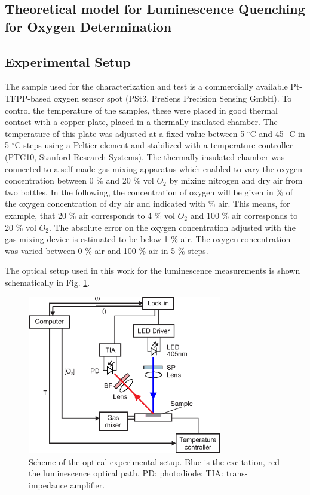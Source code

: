 \documentclass[9pt,twocolumn,twoside,pdftex]{optica}
\begin{document}
\subsection{Theoretical model for Luminescence Quenching for Oxygen Determination}
\label{Theory}

\subsection{Experimental Setup}
\label{Experimental}

The sample used for the characterization and test is a commercially available Pt-TFPP-based oxygen sensor spot (PSt3, PreSens Precision Sensing GmbH).
To control the temperature of the samples, these were placed in good thermal contact with a copper plate, placed in a thermally insulated chamber. The temperature of this plate was adjusted at a fixed value between 5 $^\circ$C and 45 $^\circ$C in 5 $^\circ$C steps using a Peltier element and stabilized with a temperature controller (PTC10, Stanford Research Systems). The thermally insulated chamber was connected to a self-made gas-mixing apparatus which enabled to vary the oxygen concentration between 0 $\%$ and 20 $\%$ vol $O_2$ by mixing nitrogen and dry air from two bottles. In the following, the concentration of oxygen will be given in $\%$ of the oxygen concentration of dry air and indicated with $\%$ air. This means, for example, that 20 $\%$ air corresponds to 4 $\%$ vol $O_2$ and 100 $\%$ air corresponds to 20 $\%$ vol $O_2$. The absolute error on the oxygen concentration adjusted with the gas mixing device is estimated to be below 1 $\%$ air. The oxygen concentration was varied between 0 $\%$ air and 100 $\%$ air in 5 $\%$ steps.
 
The optical setup used in this work for the luminescence measurements is shown schematically in Fig. \ref{fig:setup}.

\begin{figure}[htbp]
\centering
\includegraphics[keepaspectratio, width=8.5cm]{setup_auto.eps}
\caption{Scheme of the optical experimental setup. Blue is the excitation, red the luminescence optical path. PD: photodiode; TIA: trans-impedance amplifier.}
\label{fig:setup}
\end{figure}
\end{document}

